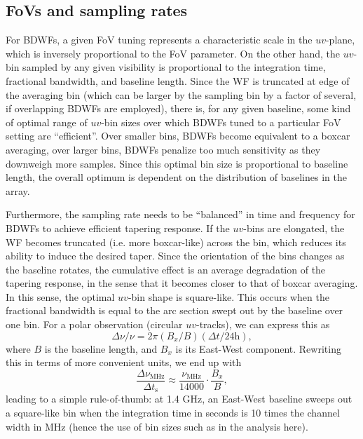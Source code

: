 \documentclass[useAMS,usenatbib]{mn2e}
\begin{document}
\subsection{FoVs and sampling rates}

For BDWFs, a given FoV tuning represents a characteristic scale in the $uv$-plane, which is inversely proportional to the 
FoV parameter. On the other hand, the $uv$-bin sampled by any given visibility is proportional to the integration time,
fractional bandwidth, and baseline length. Since the WF is truncated at edge of the averaging bin (which can be
larger by the sampling bin by a factor of several, if overlapping BDWFs are employed), there is, for any given baseline,
some kind of optimal range of $uv$-bin sizes over which BDWFs tuned to a particular FoV setting are ``efficient''. Over 
smaller bins, BDWFs become equivalent to a boxcar averaging, over larger bins, BDWFs penalize too much
sensitivity as they downweigh more samples. Since this optimal bin size is proportional to baseline length, the overall
optimum is dependent on the distribution of baselines in the array. 

Furthermore, the sampling rate needs to be ``balanced'' in time and frequency for BDWFs to achieve efficient tapering
response. If the $uv$-bins are elongated, the WF becomes truncated (i.e. more boxcar-like) across the bin, which reduces its ability 
to induce the desired taper. Since the orientation of the bins changes as the baseline rotates, the 
cumulative effect is an average degradation of the tapering response, in the
sense that it becomes closer to that of boxcar averaging. In this sense,
the optimal $uv$-bin shape is square-like. This occurs when the fractional bandwidth is equal to the arc section swept
out by the baseline over one bin. For a polar observation (circular $uv$-tracks), we can express this as
\begin{equation}
\Delta \nu/\nu = 2 \pi (B_x/B)(\Delta t/24\mathrm{h}),
\end{equation}
where $B$ is the baseline length, and $B_x$ is its East-West component. Rewriting this in terms of more convenient units,
we end up with 
\begin{equation}
\frac{\Delta \nu_\mathrm{MHz}}{\Delta t_\mathrm{s}} \approx \frac{\nu_\mathrm{MHz}}{14000} \cdot \frac{B_x}{B},
\label{eq:optimal-binsize} 
\end{equation}
leading to a simple rule-of-thumb: at 1.4 GHz, an East-West baseline sweeps out a square-like bin when the 
integration time in seconds is 10 times the channel width in MHz (hence the use of bin sizes such as  
in the analysis here). 
\end{document}
